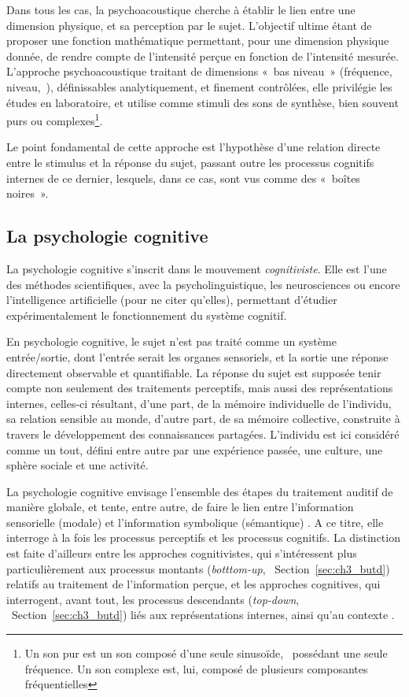 Dans tous les cas, la psychoacoustique cherche à établir le lien entre une dimension physique, et sa perception par le sujet. L'objectif ultime étant de proposer une fonction mathématique permettant, pour une dimension physique donnée, de rendre compte de l'intensité perçue en fonction de l'intensité mesurée. L'approche psychoacoustique traitant de dimensions «~bas niveau~» (fréquence, niveau,~\etc), définissables analytiquement, et finement contrôlées, elle privilégie les études en laboratoire, et utilise comme stimuli des sons de synthèse, bien souvent purs ou complexes\footnote{Un son pur est un son composé d'une seule sinusoïde, \ie~possédant une seule fréquence. Un son complexe est, lui, composé de plusieurs composantes fréquentielles}.

Le point fondamental de cette approche est l'hypothèse d'une relation directe entre le stimulus et la réponse du sujet, passant outre les processus cognitifs internes de ce dernier, lesquels, dans ce cas, sont vus comme des «~boîtes noires~».

\subsection{La psychologie cognitive}
\label{sec:ch3_psychoCogDef}

La psychologie cognitive s'inscrit dans le mouvement \emph{cognitiviste}. Elle est l'une des méthodes scientifiques, avec la psycholinguistique, les neurosciences ou encore l'intelligence artificielle (pour ne citer qu'elles), permettant d'étudier expérimentalement le fonctionnement du système cognitif.

En psychologie cognitive, le sujet n'est pas traité comme un système entrée/sortie, dont l'entrée serait les organes sensoriels, et la sortie une réponse directement observable et quantifiable. La réponse du sujet est supposée tenir compte non seulement des traitements perceptifs, mais aussi des représentations internes, celles-ci résultant, d'une part, de la mémoire individuelle de l'individu, sa relation sensible au monde, d'autre part, de sa mémoire collective, construite à travers le développement des connaissances partagées. L'individu est ici considéré comme un tout, défini entre autre par une expérience passée, une culture, une sphère sociale et une activité.

La psychologie cognitive envisage l'ensemble des étapes du traitement auditif de manière globale, et tente, entre autre, de faire le lien entre l'information sensorielle (modale) et l'information symbolique (sémantique) \citep{mcadams1994penser}. A ce titre, elle interroge à la fois les processus perceptifs et les processus cognitifs. La distinction est faite d'ailleurs entre les approches cognitivistes, qui s'intéressent plus particulièrement aux processus montants (\emph{botttom-up}, \cf~Section~\ref{sec:ch3_butd}) relatifs au traitement de l'information perçue, et les approches cognitives, qui interrogent, avant tout, les processus descendants (\emph{top-down}, \cf~Section~\ref{sec:ch3_butd}) liés aux représentations internes, ainsi qu'au contexte \citep[p. 34]{guastavino_etude_2003}. 

